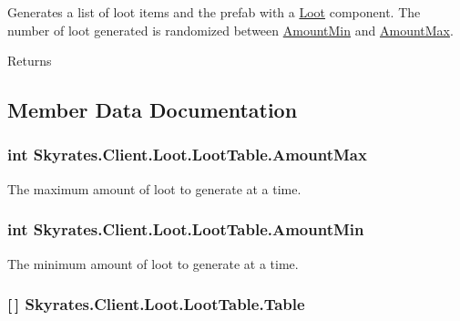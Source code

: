 Generates a list of loot items and the prefab with a \hyperlink{class_skyrates_1_1_client_1_1_loot_1_1_loot}{Loot} component. The number of loot generated is randomized between \hyperlink{class_skyrates_1_1_client_1_1_loot_1_1_loot_table_ab20cb118131a30a72bd812c4362b4b1b}{Amount\-Min} and \hyperlink{class_skyrates_1_1_client_1_1_loot_1_1_loot_table_a03d5cd741cb0ebf92a7eceb54904e87d}{Amount\-Max}. 

\begin{DoxyReturn}{Returns}

\end{DoxyReturn}


\subsection{Member Data Documentation}
\hypertarget{class_skyrates_1_1_client_1_1_loot_1_1_loot_table_a03d5cd741cb0ebf92a7eceb54904e87d}{
\subsubsection[{Amount\-Max}]{\setlength{\rightskip}{0pt plus 5cm}int Skyrates.\-Client.\-Loot.\-Loot\-Table.\-Amount\-Max}}\label{class_skyrates_1_1_client_1_1_loot_1_1_loot_table_a03d5cd741cb0ebf92a7eceb54904e87d}


The maximum amount of loot to generate at a time. 

\hypertarget{class_skyrates_1_1_client_1_1_loot_1_1_loot_table_ab20cb118131a30a72bd812c4362b4b1b}{
\subsubsection[{Amount\-Min}]{\setlength{\rightskip}{0pt plus 5cm}int Skyrates.\-Client.\-Loot.\-Loot\-Table.\-Amount\-Min}}\label{class_skyrates_1_1_client_1_1_loot_1_1_loot_table_ab20cb118131a30a72bd812c4362b4b1b}


The minimum amount of loot to generate at a time. 

\hypertarget{class_skyrates_1_1_client_1_1_loot_1_1_loot_table_a51353bf82a01b769b9b0174a22e008c0}{
\subsubsection[{Table}]{ \mbox{[}$\,$\mbox{]} Skyrates.\-Client.\-Loot.\-Loot\-Table.\-Table}}\label{class_skyrates_1_1_client_1_1_loot_1_1_loot_table_a51353bf82a01b769b9b0174a22e008c0}


